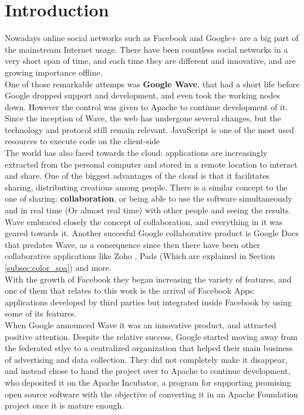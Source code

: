 \newpage
\thispagestyle{sectioned}
\chapter{Introduction}
Nowadays online social networks such as Facebook and Google+ are a big part of the mainstream Internet usage. There have been countless social networks in a very short span of time, and each time they are different and innovative, and are growing importance offline.\\[.2cm]
One of those remarkable attemps was \textbf{Google Wave}, that had a short life before Google dropped support and development, and even took the working nodes down. However the control was given to Apache to continue development of it. Since the inception of Wave, the web has undergone several changes, but the technology and protocol still remain relevant. JavaScript is one of the most used resources to execute code on the client-side\\[.2cm]
The world has also faced towards the cloud: applications are increasingly extracted from the personal computer and stored in a remote location to interact and share. One of the biggest advantages of the cloud is that it facilitates sharing, distributing creations among people. There is a similar concept to the one of sharing: \textbf{collaboration}, or being able to use the software simultaneously and in real time (Or almost real time) with other people and seeing the results. Wave embraced closely the concept of collaboration, and everything in it was geared towards it. Another succesful Google collaborative product is Google Docs \cite{ref:google_docs} that predates Wave, as a consequence since then there have been other collaborative applications like Zoho \cite{ref:zoho}, Pads (Which are explained in Section \ref{subsec:color_soa}) and more.\\[.2cm]
With the growth of Facebook they began increasing the variety of features, and one of them that relates to this work is the arrival of Facebook Apps: applications developed by third parties but integrated inside Facebook by using some of its features.\\[.2cm]
When Google announced Wave it was an innovative product, and attracted positive attention. Despite the relative success, Google started moving away from the federated stlye to a centralized organization that helped their main business of advertising and data collection. They did not completely make it disappear, and instead chose to hand the project over to Apache to continue development, who deposited it on the Apache Incubator, a program for supporting promising open source software with the objective of converting it in an Apache Foundation project once it is mature enough.\\[.2cm]
